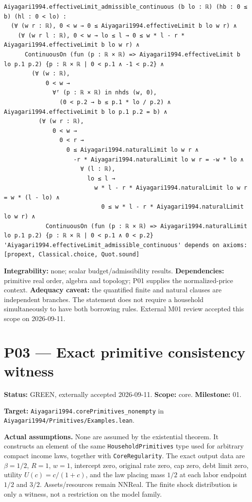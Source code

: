 \documentclass[
  11pt,
]{article}
\let\LedgerOriginalTexttt\texttt
\renewcommand{\texttt}[1]{{\small\LedgerOriginalTexttt{#1}}}
\begin{document}
\begin{verbatim}
Aiyagari1994.effectiveLimit_admissible_continuous (b lo : ℝ) (hb : 0 ≤ b) (hl : 0 < lo) :
  (∀ (w r : ℝ), 0 < w → 0 ≤ Aiyagari1994.effectiveLimit b lo w r) ∧
    (∀ (w r l : ℝ), 0 < w → lo ≤ l → 0 ≤ w * l - r * Aiyagari1994.effectiveLimit b lo w r) ∧
      ContinuousOn (fun (p : ℝ × ℝ) => Aiyagari1994.effectiveLimit b lo p.1 p.2) {p : ℝ × ℝ | 0 < p.1 ∧ -1 < p.2} ∧
        (∀ (w : ℝ),
            0 < w →
              ∀ᶠ (p : ℝ × ℝ) in nhds (w, 0),
                (0 < p.2 → b ≤ p.1 * lo / p.2) ∧ Aiyagari1994.effectiveLimit b lo p.1 p.2 = b) ∧
          (∀ (w r : ℝ),
              0 < w →
                0 < r →
                  0 ≤ Aiyagari1994.naturalLimit lo w r ∧
                    -r * Aiyagari1994.naturalLimit lo w r = -w * lo ∧
                      ∀ (l : ℝ),
                        lo ≤ l →
                          w * l - r * Aiyagari1994.naturalLimit lo w r = w * (l - lo) ∧
                            0 ≤ w * l - r * Aiyagari1994.naturalLimit lo w r) ∧
            ContinuousOn (fun (p : ℝ × ℝ) => Aiyagari1994.naturalLimit lo p.1 p.2) {p : ℝ × ℝ | 0 < p.1 ∧ 0 < p.2}
'Aiyagari1994.effectiveLimit_admissible_continuous' depends on axioms: [propext, Classical.choice, Quot.sound]
\end{verbatim}

\textbf{Integrability:} none; scalar budget/admissibility results.
\textbf{Dependencies:} primitive real order, algebra and topology; P01
supplies the normalized-price context. \textbf{Adequacy caveat:} the
quantified finite and natural clauses are independent branches. The
statement does not require a household simultaneously to have both
borrowing rules. External M01 review accepted this scope on 2026-09-11.

\section{P03 --- Exact primitive consistency
witness}\label{p03-exact-primitive-consistency-witness}

\textbf{Status:} GREEN, externally accepted 2026-09-11. \textbf{Scope:}
core. \textbf{Milestone:} 01.

\textbf{Target:} \texttt{Aiyagari1994.corePrimitives\_nonempty} in
\texttt{Aiyagari1994/Primitives/Examples.lean}.

\textbf{Actual assumptions.} None are assumed by the existential
theorem. It constructs an element of the same
\texttt{HouseholdPrimitives} type used for arbitrary compact income
laws, together with \texttt{CoreRegularity}. The exact output data are
\(\beta=1/2\), \(R=1\), \(w=1\), intercept zero, original rate zero, cap
zero, debt limit zero, utility \(U(c)=c/(1+c)\), and the law placing
mass \(1/2\) at each labor endpoint \(1/2\) and \(3/2\).
Assets/resources remain NNReal. The finite shock distribution is only a
witness, not a restriction on the model family.
\end{document}
